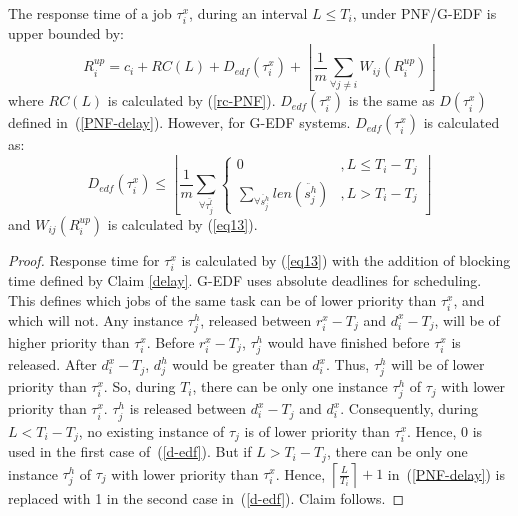 \begin{clm}\label{response time ecm PNF}
The response time of a job $\tau_{i}^{x}$, during an interval $L\le T_{i}$, under PNF/G-EDF is upper bounded by:
\begin{equation}
R_{i}^{up}=c_{i}+RC(L)+D_{edf}(\tau_{i}^{x})+\left\lfloor \frac{1}{m}\sum_{\forall j\ne i}W_{ij}(R_{i}^{up})\right\rfloor 
\end{equation}
where $RC(L)$ is calculated by (\ref{rc-PNF}). $D_{edf}(\tau_{i}^{x})$
is the same as $D(\tau_{i}^{x})$ defined in~(\ref{PNF-delay}). However, for G-EDF systems. $D_{edf}(\tau_i^x)$ is calculated as:
\begin{equation}
D_{edf}(\tau_{i}^{x})\le\left\lfloor \frac{1}{m}\sum_{\forall\bar{\tau_{j}^{l}}}\begin{cases}
0 & ,L\le T_{i}-T_{j}\\
\sum_{\forall\ddot{s_{j}^{h}}}len\left(\ddot{s_{j}^{h}}\right) & ,L>T_{i}-T_{j}
\end{cases}\right\rfloor \label{d-edf}
\end{equation}
and $W_{ij}(R_{i}^{up})$ is calculated by (\ref{eq13}).
\end{clm}
\begin{proof}\normalfont
Response time for $\tau_{i}^{x}$ is calculated by (\ref{eq13}) with the addition of blocking time defined by Claim \ref{delay}. G-EDF uses absolute deadlines for scheduling. This defines which jobs of the same task can be of lower priority than $\tau_{i}^{x}$, and which will not. Any instance $\tau_j^h$, released between $r_i^x - T_j$ and $d_i^x - T_j$, will be of higher priority than $\tau_i^x$. Before $r_i^x-T_j$, $\tau_j^h$ would have finished before $\tau_i^x$ is released. After $d_i^x-T_j$, $d_j^h$ would be greater than $d_i^x$. Thus, $\tau_j^h$ will be of lower priority than $\tau_i^x$. So, during $T_i$, there can be only one instance $\tau_j^h$ of $\tau_j$ with lower priority than $\tau_i^x$. $\tau_j^h$ is released between $d_i^x-T_j$ and $d_i^x$. Consequently, during $L<T_i-T_j$, no existing instance of $\tau_j$ is of lower  priority than $\tau_i^x$. Hence, 0 is used in the first case of~(\ref{d-edf}). But if $L>T_i-T_j$, there can be only one instance $\tau_j^h$ of $\tau_j$ with lower priority than $\tau_i^x$. Hence, $\left\lceil\frac{L}{T_i}\right\rceil+1$ in~(\ref{PNF-delay}) is replaced with 1 in the second case in~(\ref{d-edf}). Claim follows.
\end{proof}


